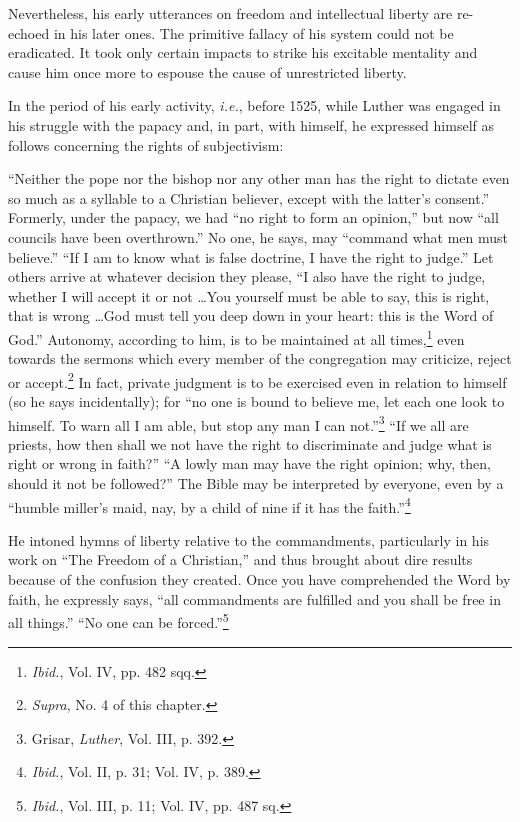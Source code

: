 Nevertheless, his early utterances on freedom and intellectual
liberty are re-echoed in his later ones. The primitive fallacy of his
system could not be eradicated. It took only certain impacts to strike
his excitable mentality and cause him once more to espouse the cause
of unrestricted liberty.

In the period of his early activity, \textit{i.e.}, before 1525, while Luther
was engaged in his struggle with the papacy and, in part, with himself,
he expressed himself as follows concerning the rights of subjectivism:

“Neither the pope nor the bishop nor any other man has the right to
dictate even so much as a syllable to a Christian believer, except with the
latter’s consent.” Formerly, under the papacy, we had “no right to form
an opinion,” but now “all councils have been overthrown.” No one, he says,
may “command what men must believe.” “If I am to know what is false
doctrine, I have the right to judge.” Let others arrive at whatever decision they
please, “I also have the right to judge, whether I will accept it or not \dots You
yourself must be able to say, this is right, that is wrong \dots God
must tell you deep down in your heart: this is the Word of God.” Autonomy,
according to him, is to be maintained at all times,\footnote{\textit{Ibid.}, Vol. IV, pp. 482 sqq.}
even towards the
sermons which every member of the congregation may criticize, reject or
accept.\footnote{\textit{Supra}, No. 4 of this chapter.}
In fact, private judgment is to be exercised even in relation to
himself (so he says incidentally); for “no one is bound to believe me, let
each one look to himself. To warn all I am able, but stop any man I can
not.”\footnote{Grisar, \textit{Luther}, Vol. III, p. 392.}
“If we all are priests, how then shall we not have the right to
discriminate and judge what is right or wrong in faith?” “A lowly man
may have the right opinion; why, then, should it not be followed?” The
Bible may be interpreted by everyone, even by a “humble miller’s maid, nay,
by a child of nine if it has the faith.”\footnote{\textit{Ibid.}, Vol. II, p. 31; Vol. IV, p. 389.}

He intoned hymns of liberty relative to the commandments, particularly
in his work on “The Freedom of a Christian,” and thus brought about dire
results because of the confusion they created. Once you have comprehended
the Word by faith, he expressly says, “all commandments are fulfilled and
you shall be free in all things.” “No one can be forced.”\footnote
{\textit{Ibid.}, Vol. III, p. 11; Vol. IV, pp. 487 sq.}


